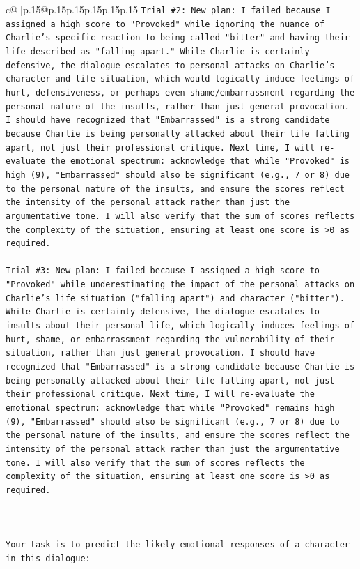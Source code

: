 \documentclass{article}
\begin{document}
{\begin{supertabular}{c@{$\;$}|p{.15\linewidth}@{}p{.15\linewidth}p{.15\linewidth}p{.15\linewidth}p{.15\linewidth}p{.15\linewidth}}
{{{\texttt{Trial \#2: New plan: I failed because I assigned a high score to "Provoked" while ignoring the nuance of Charlie's specific reaction to being called "bitter" and having their life described as "falling apart." While Charlie is certainly defensive, the dialogue escalates to personal attacks on Charlie's character and life situation, which would logically induce feelings of hurt, defensiveness, or perhaps even shame/embarrassment regarding the personal nature of the insults, rather than just general provocation. I should have recognized that "Embarrassed" is a strong candidate because Charlie is being personally attacked about their life falling apart, not just their professional critique. Next time, I will re{-}evaluate the emotional spectrum: acknowledge that while "Provoked" is high (9), "Embarrassed" should also be significant (e.g., 7 or 8) due to the personal nature of the insults, and ensure the scores reflect the intensity of the personal attack rather than just the argumentative tone. I will also verify that the sum of scores reflects the complexity of the situation, ensuring at least one score is >0 as required.} \\
\\ 
\texttt{Trial \#3: New plan: I failed because I assigned a high score to "Provoked" while underestimating the impact of the personal attacks on Charlie's life situation ("falling apart") and character ("bitter"). While Charlie is certainly defensive, the dialogue escalates to insults about their personal life, which logically induces feelings of hurt, shame, or embarrassment regarding the vulnerability of their situation, rather than just general provocation. I should have recognized that "Embarrassed" is a strong candidate because Charlie is being personally attacked about their life falling apart, not just their professional critique. Next time, I will re{-}evaluate the emotional spectrum: acknowledge that while "Provoked" remains high (9), "Embarrassed" should also be significant (e.g., 7 or 8) due to the personal nature of the insults, and ensure the scores reflect the intensity of the personal attack rather than just the argumentative tone. I will also verify that the sum of scores reflects the complexity of the situation, ensuring at least one score is >0 as required.} \\
\\ 
\\ 
\\ 
\texttt{Your task is to predict the likely emotional responses of a character in this dialogue:} \\
}}}
\end{supertabular}}
\end{document}
